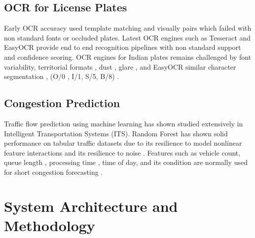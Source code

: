 \documentclass[conference]{IEEEtran}
\begin{document}
\subsection{OCR for License Plates}

Early OCR accuracy used template matching and visually pairs which failed with non standard fonts or occluded plates. Latest OCR engines such as Tesseract \cite{tesseract} and EasyOCR \cite{easyocr} provide end to end recognition pipelines with non standard support and confidence scoring. OCR engines for Indian plates remains challenged by font variability, territorial formats , dust , glare , and EasyOCR similar character segmentation , (O/0 , I/1, S/5, B/8) \cite{nadiminti2022}.
\subsection{Congestion Prediction}

Traffic flow prediction using machine learning has shown studied extensively in Intelligent Transportation Systems (ITS). Random Forest has shown solid performance on tabular traffic datasets due to its resilience to model nonlinear feature interactions and its resilience to noise \cite{breiman2001,sklearn}. Features such as vehicle count, queue length , processing time , time of day, and its condition are normally used for short congestion forecasting .

\section{System Architecture and Methodology}
\end{document}
